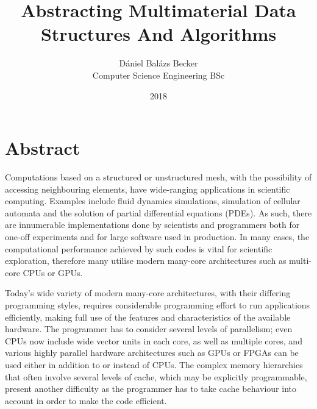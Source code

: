 \documentclass[fontsize=11pt, appendixprefix=true]{scrreprt}
\author{Dániel Balázs Becker\\Computer Science Engineering BSc}
\title{Abstracting Multimaterial Data Structures And Algorithms}
\date{2018}
\newif\ifTDK
\newcommand{\pushtobottom}{\vspace*{\fill}}
\newcommand{\signatureline}[1]{\begin{flushright}
	\vspace*{.5cm}\par\noindent\makebox[2.5in]{\hrulefill}
	\par\noindent\makebox[2.5in][c]{#1}
	\end{flushright}
}
\begin{document}
\maketitle


\newpage




\setcounter{page}{3}
\tableofcontents
\newpage
\section*{Abstract}
Computations based on a structured or unstructured mesh, with the possibility of
accessing neighbouring elements, have wide-ranging applications in scientific
computing. Examples include fluid dynamics simulations, simulation of cellular
automata and the solution of partial differential equations (PDEs). As such,
there are innumerable implementations done by scientists and programmers both
for one-off experiments and for large software used in production. In many
cases, the computational performance achieved by such codes is vital for
scientific exploration, therefore many utilise modern many-core architectures
such as multi-core CPUs or GPUs.

Today's wide variety of modern many-core architectures, with their differing
programming styles, requires considerable programming effort to run applications
efficiently, making full use of the features and characteristics of the
available hardware. The programmer has to consider several levels of
parallelism; even CPUs now include wide vector units in each core, as well as
multiple cores, and various highly parallel hardware architectures such as GPUs
or FPGAs can be used either in addition to or instead of CPUs. The complex
memory hierarchies that often involve several levels of cache, which may be
explicitly programmable, present another difficulty as the programmer has to
take cache behaviour into account in order to make the code efficient.
\end{document}
